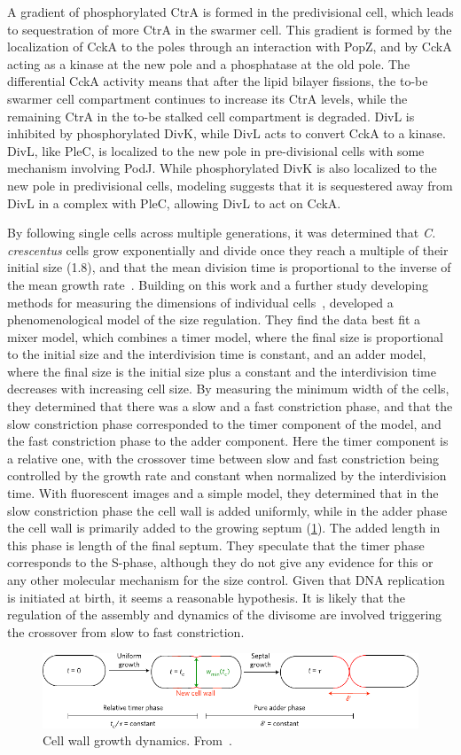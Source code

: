 A gradient of phosphorylated CtrA is formed in the predivisional cell, which leads to sequestration of more CtrA in the swarmer cell.
This gradient is formed by the localization of CckA to the poles through an interaction with PopZ, and by CckA acting as a kinase at the new pole and a phosphatase at the old pole.
The differential CckA activity means that after the lipid bilayer fissions, the to-be swarmer cell compartment continues to increase its CtrA levels, while the remaining CtrA in the to-be stalked cell compartment is degraded.
DivL is inhibited by phosphorylated DivK, while DivL acts to convert CckA to a kinase.
DivL, like PleC, is localized to the new pole in pre-divisional cells with some mechanism involving PodJ.
While phosphorylated DivK is also localized to the new pole in predivisional cells, modeling suggests that it is sequestered away from DivL in a complex with PleC, allowing DivL to act on CckA.

By following single cells across multiple generations, it was determined that \textit{C. crescentus} cells grow exponentially and divide once they reach a multiple of their initial size (1.8), and that the mean division time is proportional to the inverse of the mean growth rate~\cite{iyer-biswas2014}.
Building on this work and a further study developing methods for measuring the dimensions of individual cells~\cite{wright2015}, \textcite{banerjee2017} developed a phenomenological model of the size regulation.
They find the data best fit a mixer model, which combines a timer model, where the final size is proportional to the initial size and the interdivision time is constant, and an adder model, where the final size is the initial size plus a constant and the interdivision time decreases with increasing cell size.
By measuring the minimum width of the cells, they determined that there was a slow and a fast constriction phase, and that the slow constriction phase corresponded to the timer component of the model, and the fast constriction phase to the adder component.
Here the timer component is a relative one, with the crossover time between slow and fast constriction being controlled by the growth rate and constant when normalized by the interdivision time.
With fluorescent images and a simple model, they determined that in the slow constriction phase the cell wall is added uniformly, while in the adder phase the cell wall is primarily added to the growing septum (\cref{fig:cell-wall-growth}).
The added length in this phase is length of the final septum.
They speculate that the timer phase corresponds to the S-phase, although they do not give any evidence for this or any other molecular mechanism for the size control.
Given that DNA replication is initiated at birth, it seems a reasonable hypothesis.
It is likely that the regulation of the assembly and dynamics of the divisome are involved triggering the crossover from slow to fast constriction.

\begin{figure}
    \centering
    \includegraphics{cell-wall-growth}
    \caption{
        Cell wall growth dynamics.
        From~\cite{banerjee2017}.
        \label{fig:cell-wall-growth}
     }
\end{figure}

